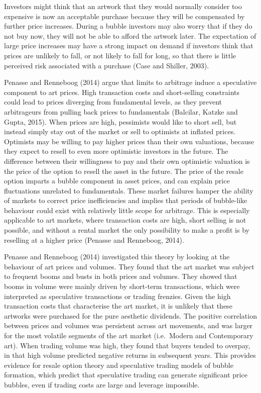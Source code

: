 \documentclass[12pt,]{article}
\begin{document}
Investors might think that an artwork that they would normally consider
too expensive is now an acceptable purchase because they will be
compensated by further price increases. During a bubble investors may
also worry that if they do not buy now, they will not be able to afford
the artwork later. The expectation of large price increases may have a
strong impact on demand if investors think that prices are unlikely to
fall, or not likely to fall for long, so that there is little perceived
risk associated with a purchase (Case and Shiller, 2003).

Penasse and Renneboog (2014) argue that limits to arbitrage induce a
speculative component to art prices. High transaction costs and
short-selling constraints could lead to prices diverging from
fundamental levels, as they prevent arbitrageurs from pulling back
prices to fundamentals (Balcilar, Katzke and Gupta, 2015). When prices
are high, pessimists would like to short sell, but instead simply stay
out of the market or sell to optimists at inflated prices. Optimists may
be willing to pay higher prices than their own valuations, because they
expect to resell to even more optimistic investors in the future. The
difference between their willingness to pay and their own optimistic
valuation is the price of the option to resell the asset in the future.
The price of the resale option imparts a bubble component in asset
prices, and can explain price fluctuations unrelated to fundamentals.
These market failures hamper the ability of markets to correct price
inefficiencies and implies that periods of bubble-like behaviour could
exist with relatively little scope for arbitrage. This is especially
applicable to art markets, where transaction costs are high, short
selling is not possible, and without a rental market the only
possibility to make a profit is by reselling at a higher price (Penasse
and Renneboog, 2014).

Penasse and Renneboog (2014) investigated this theory by looking at the
behaviour of art prices and volumes. They found that the art market was
subject to frequent booms and busts in both prices and volumes. They
showed that booms in volume were mainly driven by short-term
transactions, which were interpreted as speculative transactions or
trading frenzies. Given the high transaction costs that characterise the
art market, it is unlikely that these artworks were purchased for the
pure aesthetic dividends. The positive correlation between prices and
volumes was persistent across art movements, and was larger for the most
volatile segments of the art market (i.e.~Modern and Contemporary art).
When trading volume was high, they found that buyers tended to overpay,
in that high volume predicted negative returns in subsequent years. This
provides evidence for resale option theory and speculative trading
models of bubble formation, which predict that speculative trading can
generate significant price bubbles, even if trading costs are large and
leverage impossible.
\end{document}
